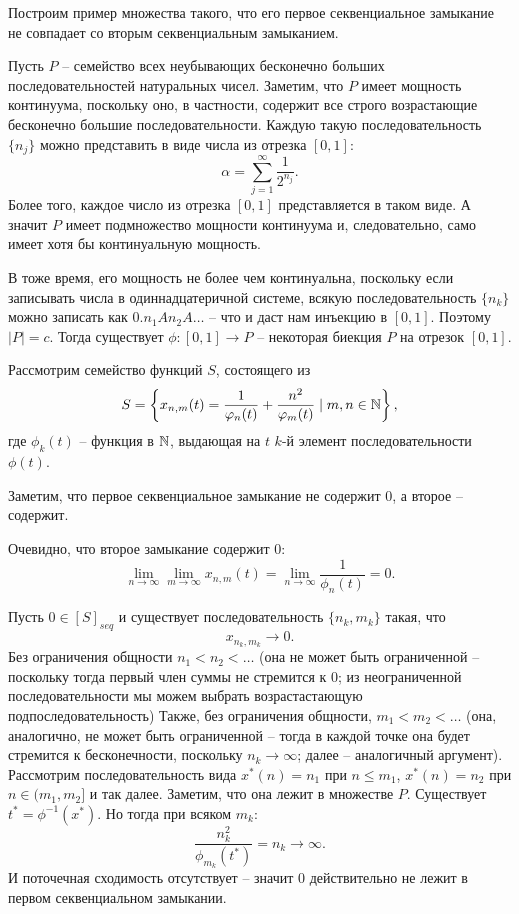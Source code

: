 \begin{example}
    Построим пример множества такого, что его первое секвенциальное замыкание не совпадает со вторым секвенциальным замыканием.

    Пусть $P$ -- семейство всех неубывающих бесконечно больших последовательностей натуральных чисел.
    Заметим, что $P$ имеет мощность континуума, поскольку оно, в частности, содержит все строго возрастающие бесконечно большие последовательности.
    Каждую такую последовательность $\{n_j\}$ можно представить в виде числа из отрезка $[0, 1]\colon$
    \[
        \alpha = \sum_{j = 1}^{\infty} \frac{1}{2^{n_j}}.
    \]
    Более того, каждое число из отрезка $[0, 1]$ представляется в таком виде.
    А значит $P$ имеет подмножество мощности континуума и, следовательно, само имеет хотя бы континуальную мощность.

    В тоже время, его мощность не более чем континуальна, поскольку если записывать числа в одиннадцатеричной системе, всякую последовательность $\{n_k\}$ можно записать как $0.n_1 A n_2 A \ldots$ -- что и даст нам инъекцию в $[0, 1]$.
    Поэтому $|P| = c$.
    Тогда существует $\phi\colon [0, 1] \to P$ -- некоторая биекция $P$ на отрезок $[0, 1]$.

    Рассмотрим семейство функций $S$, состоящего из
    \[
        S = \left\{ x_{n, m}(t) = \frac{1}{\varphi_n(t)} + \frac{n^2}{\varphi_m(t)} \mid m, n \in \mathbb{N} \right\},
    \]
    где $\phi_k(t)$ -- функция в $\mathbb{N}$, выдающая на $t$  $k$-й элемент последовательности $\phi(t)$.

    Заметим, что первое секвенциальное замыкание не содержит $0$, а второе -- содержит.

    Очевидно, что второе замыкание содержит $0\colon$
    \[
        \lim_{n \rightarrow \infty} \lim_{m \rightarrow \infty} x_{n, m}(t) = \lim_{n \rightarrow \infty} \frac{1}{\phi_n(t)} = 0.
    \]

    Пусть $0 \in [S]_{seq}$ и существует последовательность $\{n_k, m_k\}$ такая, что
    \[
        x_{n_k, m_k} \rightarrow 0.
    \]
    Без ограничения общности $n_1 < n_2 < \ldots$ (она не может быть ограниченной -- поскольку тогда первый член суммы не стремится к 0; из неограниченной последовательности мы можем выбрать возрастастающую подпоследовательность)
    Также, без ограничения общности, $m_1 < m_2 < \ldots$ (она, аналогично, не может быть ограниченной -- тогда в каждой точке она будет стремится к бесконечности, поскольку $n_k \rightarrow \infty$; далее -- аналогичный аргумент).
    Рассмотрим последовательность вида $x^*(n) = n_1$ при $n \leq m_1$, $x^*(n) = n_2$ при $n \in (m_1, m_2]$ и так далее.
    Заметим, что она лежит в множестве $P$.
    Существует $t^* = \phi^{-1}(x^*)$.
    Но тогда при всяком $m_k\colon$
    \[
        \frac{n_k^2}{\phi_{m_k}(t^*)} = n_k \rightarrow \infty.
    \]
    И поточечная сходимость отсутствует -- значит $0$ действительно не лежит в первом секвенциальном замыкании.
\end{example}